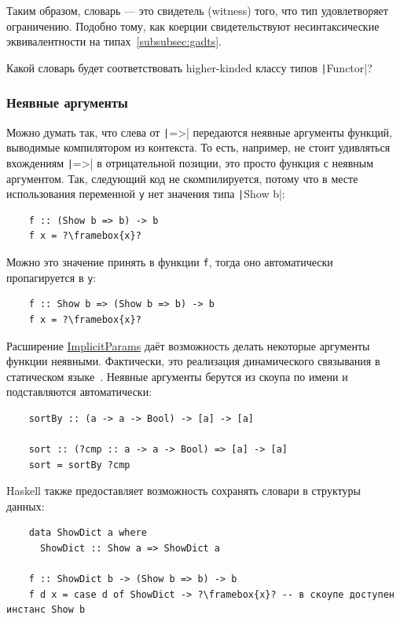 Таким образом, словарь --- это свидетель (witness) того, что тип удовлетворяет ограничению.
Подобно тому, как коерции свидетельствуют несинтаксические эквивалентности на типах~\ref{subsubsec:gadts}.

\begin{task}
    Какой словарь будет соответствовать higher-kinded классу типов \texttt|Functor|?
\end{task}

\subsubsection{Неявные аргументы}

Можно думать так, что слева от \texttt|=>| передаются неявные аргументы функций, выводимые компилятором из контекста.
То есть, например, не стоит удивляться вхождениям \texttt|=>| в отрицательной позиции, это просто функция с неявным аргументом.
Так, следующий код не скомпилируется, потому что в месте использования переменной \texttt{y} нет значения типа \texttt|Show b|:
\begin{verbatim}
    f :: (Show b => b) -> b
    f x = ?\framebox{x}?
\end{verbatim}
Можно это значение принять в функции \texttt{f}, тогда оно автоматически пропагируется в \texttt{y}:
\begin{verbatim}
    f :: Show b => (Show b => b) -> b
    f x = ?\framebox{x}?
\end{verbatim}

Расширение \href{https://ghc.gitlab.haskell.org/ghc/doc/users_guide/exts/implicit_parameters.html}{ImplicitParams} даёт возможность делать некоторые аргументы функции неявными.
Фактически, это реализация динамического связывания в статическом языке~\cite{lewis2000implicit}.
Неявные аргументы берутся из скоупа по имени и подставляются автоматически:
\begin{verbatim}
    sortBy :: (a -> a -> Bool) -> [a] -> [a]

    sort :: (?cmp :: a -> a -> Bool) => [a] -> [a]
    sort = sortBy ?cmp
\end{verbatim}

Haskell также предоставляет возможность сохранять словари в структуры данных:
\begin{verbatim}
    data ShowDict a where
      ShowDict :: Show a => ShowDict a

    f :: ShowDict b -> (Show b => b) -> b
    f d x = case d of ShowDict -> ?\framebox{x}? -- в скоупе доступен инстанс Show b
\end{verbatim}

